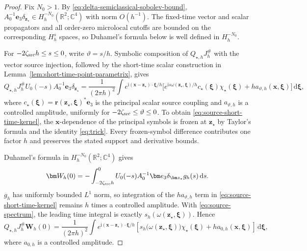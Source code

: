 \documentclass[11pt,reqno]{amsart}
\newcommand{\ii}{\mathrm{i}}
\newcommand{\dd}{\,\mathrm{d}}
\numberwithin{equation}{section}
\begin{document}
\begin{proof}
Fix $N_0>1$. By \eqref{eq:delta-semiclassical-sobolev-bound}, $A_0^{-1}\bm e_3\delta_{\bm z_\star}\in H_h^{-N_0}(\mathbb R^2;\mathbb C^4)$
with norm $O(h^{-1})$. The fixed-time vector and scalar propagators and all order-zero microlocal cutoffs are bounded on the corresponding $H_h^s$ spaces, so Duhamel's formula below is well defined in $H_h^{-N_0}$.

For $-2\zeta_{\rm src}h\le s\le0$, write $\vartheta=s/h$. Symbolic composition of $Q_{\star,h}J_h^{\#}$ with the vector source injection, followed by the short-time scalar construction in Lemma~\ref{lem:short-time-point-parametrix}, gives
\begin{equation}\label{eq:source-short-time-kernel}
 Q_{\star,h}J_h^{\#}U_0(-s)A_0^{-1}\bm e_3\delta_{\bm z_\star}
 =\frac1{(2\pi h)^2}\int e^{\ii(\bm x-\bm z_\star)\cdot\bm\xi/h}
 \bigl[e^{\ii s\omega(\bm z_\star,\bm\xi)/h}c_\star(\bm\xi)\chi_\star(\bm\xi)+h a_{\vartheta,h}(\bm x,\bm\xi)\bigr]\dd\bm\xi,
\end{equation}
where $c_\star(\bm\xi)=\bm r(\bm z_\star,\bm\xi)^*\bm e_3$ is the principal scalar source coupling and $a_{\vartheta,h}$ is a controlled amplitude, uniformly for $-2\zeta_{\rm src}\le\vartheta\le0$. To obtain \eqref{eq:source-short-time-kernel}, the $\bm x$-dependence of the principal symbols is frozen at $\bm z_\star$ by Taylor's formula and the identity \eqref{eq:trick}. Every frozen-symbol difference contributes one factor $h$ and preserves the stated support and derivative bounds.

Duhamel's formula in $H_h^{-N_0}(\mathbb R^2;\mathbb C^4)$ gives
\begin{equation*}
 \bm W_h(0)=-\int_{-2\zeta_{\rm src}h}^{0}U_0(-s)A_0^{-1}\bm e_3\delta_{\bm z_\star}g_h(s)\dd s.
\end{equation*}
$g_h$ has uniformly bounded $L^1$ norm, so integration of the $h a_{\vartheta,h}$ term in \eqref{eq:source-short-time-kernel} remains $h$ times a controlled amplitude. With \eqref{eq:source-spectrum}, the leading time integral is exactly $s_h(\omega(\bm z_\star,\bm\xi))$. Hence
\begin{equation}\label{eq:source-state-before-time-derivative}
 Q_{\star,h}J_h^{\#}\bm W_h(0)
 =\frac1{(2\pi h)^2}\int e^{\ii(\bm x-\bm z_\star)\cdot\bm\xi/h}
 \left[s_h\bigl(\omega(\bm z_\star,\bm\xi)\bigr)\chi_\star(\bm\xi)
 +h a_{0,h}(\bm x,\bm\xi)\right]\dd\bm\xi,
\end{equation}
where $a_{0,h}$ is a controlled amplitude.


\end{proof}
\end{document}
